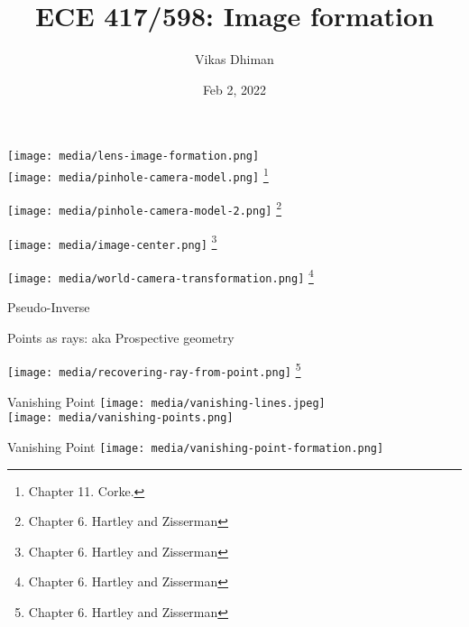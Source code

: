 \documentclass{beamer}
\title{ECE 417/598: Image formation}
\author{Vikas Dhiman}
\date{Feb 2, 2022}
\begin{document}
\begin{frame}
  \titlepage
  \end{frame}
\begin{frame}
  \texttt{[image: media/lens-image-formation.png]}
  \\
  \texttt{[image: media/pinhole-camera-model.png]}
  \footnote{Chapter 11. Corke.}
\end{frame}
\begin{frame}
  \texttt{[image: media/pinhole-camera-model-2.png]}
  \footnote{Chapter 6. Hartley and Zisserman}
  \end{frame}
  \begin{frame}
    \texttt{[image: media/image-center.png]}
    \footnote{Chapter 6. Hartley and Zisserman}
  \end{frame}

  \begin{frame}
    \texttt{[image: media/world-camera-transformation.png]}
    \footnote{Chapter 6. Hartley and Zisserman}
  \end{frame}

  \begin{frame}{Pseudo-Inverse}

  \end{frame}

  \begin{frame}{Points as rays: aka Prospective geometry}
  \end{frame}

  \begin{frame}
    \texttt{[image: media/recovering-ray-from-point.png]}
    \footnote{Chapter 6. Hartley and Zisserman}
  \end{frame}

  \begin{frame}{Vanishing Point}
    \texttt{[image: media/vanishing-lines.jpeg]}
    \\
    \texttt{[image: media/vanishing-points.png]}
  \end{frame}

  \begin{frame}{Vanishing Point}
    \texttt{[image: media/vanishing-point-formation.png]}
  \end{frame}
\end{document}
